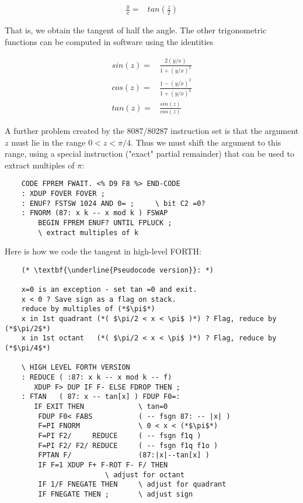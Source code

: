 \begin{align}
    \label{eq:04_01}
    \frac{y}{x} =& tan(\frac{z}{2})
\end{align}

That is, we obtain the tangent of half the angle. The other trigonometric functions can be computed in software using the identities

\begin{align}
    sin(z) =& \frac{2(y/x)}{1 + (y/x)^{2}}       \\
    cos(z) =& \frac{1 - (y/x)^2}{1 + (y/x)^2}   \\
    tan(z) =& \frac{sin(z)}{cos(z)}
\end{align}

A further problem created by the 8087/80287 instruction set is that the argument $z$ must lie in the range $0 < z < \pi/4$. Thus we must shift the argument to this range, using a special instruction  ("exact" partial remainder) that can be used to extract multiples of $\pi$:

\begin{lstlisting}
    CODE FPREM FWAIT. <% D9 F8 %> END-CODE
    : XDUP FOVER FOVER ;
    : ENUF? FSTSW 1024 AND 0= ;     \ bit C2 =0?
    : FNORM (87: x k -- x mod k ) FSWAP
        BEGIN FPREM ENUF? UNTIL FPLUCK ;
        \ extract multiples of k
\end{lstlisting}

Here is how we code the tangent in high-level FORTH:

\begin{lstlisting}
    (* \textbf{\underline{Pseudocode version}}: *)
    
    x=0 is an exception - set tan =0 and exit.
    x < 0 ? Save sign as a flag on stack.
    reduce by multiples of (*$\pi$*)
    x in 1st quadrant (*( $\pi/2 < x < \pi$ )*) ? Flag, reduce by (*$\pi/2$*)
    x in 1st octant   (*( $\pi/2 < x < \pi$ )*) ? Flag, reduce by (*$\pi/4$*)

    \ HIGH LEVEL FORTH VERSION
    : REDUCE ( :87: x k -- x mod k -- f)
       XDUP F> DUP IF F- ELSE FDROP THEN ;
    : FTAN   ( 87: x -- tan[x] ) FDUP F0=:
       IF EXIT THEN             \ tan=0
        FDUP F0< FABS           ( -- fsgn 87: -- |x| )
        F=PI FNORM              \ 0 < x < (*$\pi$*)
        F=PI F2/     REDUCE     ( -- fsgn f1q )
        F=PI F2/ F2/ REDUCE     ( -- fsgn f1q f1o )
        FPTAN F/                (87:|x|--tan[x] )
        IF F=1 XDUP F+ F-ROT F- F/ THEN
                        \ adjust for octant
        IF 1/F FNEGATE THEN     \ adjust for quadrant
        IF FNEGATE THEN ;       \ adjust sign
\end{lstlisting}

